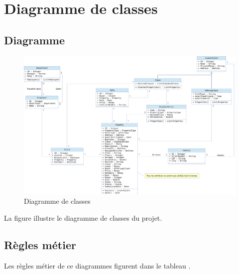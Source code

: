 \chapter{Diagramme de classes}

\section{Diagramme}

\begin{figure}
  \centering
  \includegraphics[angle=90,height=0.99\textheight]{IMG/cd}
  \caption{Diagramme de classes}
  \label{img_cd}
\end{figure}

La figure  illustre le diagramme de classes du projet.

\section{Règles métier}

Les règles métier de ce diagrammes figurent dans le tableau .

